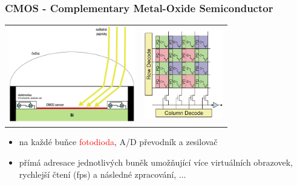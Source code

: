 \documentclass{beamer}
\begin{document}
	\begin{frame}[t,fragile]
		\frametitle{CMOS - Complementary Metal-Oxide Semiconductor}	


		\centering\begin{tabular}{ll}
			\includegraphics[width=55mm]{cmos-schema.pdf} &		
			\includegraphics[width=35mm]{cmos-address.png}
		\end{tabular}
		
 
		\begin{itemize}		
			\item na každé buňce \textcolor{red}{fotodioda}, A/D převodník a zesilovač
			\item přímá adresace jednotlivých buněk umožňující více virtuálních obrazovek, rychlejší čtení (fps) a následné zpracování, ...
			\newline
			
		\end{itemize}			

	\end{frame}
	
\end{document}
